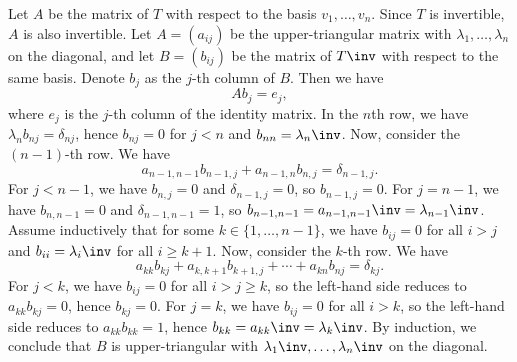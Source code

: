 \begin{me}
    Let $A$ be the matrix of $T$ with respect to the basis $v_1, \ldots, v_n$. 
    Since $T$ is invertible, $A$ is also invertible.
    Let $A = (a_{ij})$ be the upper-triangular matrix with $\lambda_1, \ldots, \lambda_n$ on the diagonal, and let $B = (b_{ij})$ be the matrix of $T\inv$ with respect to the same basis.
    Denote $b_j$ as the $j$-th column of $B$.
    Then we have
    \[
        Ab_j = e_j,
    \]
    where $e_j$ is the $j$-th column of the identity matrix. 
    In the $n$th row, we have $\lambda_n b_{nj} = \delta_{nj}$, hence $b_{nj} = 0$ for $j < n$ and $b_{nn} = \lambda_n\inv$.
    Now, consider the $(n-1)$-th row. We have
    \[
        a_{n-1,n-1}b_{n-1,j} + a_{n-1,n}b_{n,j} = \delta_{n-1,j}.
    \]
    For $j < n-1$, we have $b_{n,j} = 0$ and $\delta_{n-1,j} = 0$, so $b_{n-1,j} = 0$.
    For $j = n-1$, we have $b_{n,n-1} = 0$ and $\delta_{n-1,n-1} = 1$, so $b_{n-1,n-1} = a_{n-1,n-1}\inv = \lambda_{n-1}\inv$.
    Assume inductively that for some $k \in \{1, \ldots, n-1\}$, we have $b_{ij} = 0$ for all $i > j$ and $b_{ii} = \lambda_i\inv$ for all $i \geq k+1$.
    Now, consider the $k$-th row. We have
    \[
        a_{kk}b_{kj} + a_{k,k+1}b_{k+1,j} + \cdots + a_{kn}b_{nj} = \delta_{kj}.
    \]
    For $j < k$, we have $b_{ij} = 0$ for all $i > j \geq k$, so the left-hand side reduces to $a_{kk}b_{kj} = 0$, hence $b_{kj} = 0$.
    For $j = k$, we have $b_{ij} = 0$ for all $i > k$, so the left-hand side reduces to $a_{kk}b_{kk} = 1$, hence $b_{kk} = a_{kk}\inv = \lambda_k\inv$.
    By induction, we conclude that $B$ is upper-triangular with $\lambda_1\inv, \ldots, \lambda_n\inv$ on the diagonal.
\end{me}